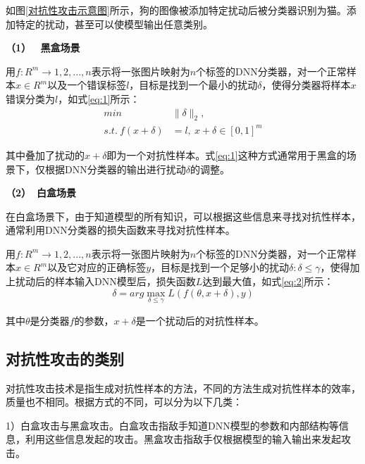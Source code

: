 如图\ref{对抗性攻击示意图}所示，狗的图像被添加特定扰动后被分类器识别为猫。添加特定的扰动，甚至可以使模型输出任意类别。

\noindent\textbf{（1） \  黑盒场景   }

用$f:R^m \rightarrow {1,2,...,n}$表示将一张图片映射为$n$个标签的DNN分类器，对一个正常样本$x \in R^m$以及一个错误标签$l$，目标是找到一个最小的扰动$\delta$，使得分类器将样本$x$错误分类为$l$，如式\ref{eq:1}所示：
\begin{equation}
	\label{eq:1}
	\begin{split}
	min&\parallel \delta \parallel_2, \\
	 s.t. \ f(x + \delta) &= l,\ x + \delta \in [0,1]^m
	\end{split}
\end{equation}

其中叠加了扰动的$x+\delta$即为一个对抗性样本。式\ref{eq:1}这种方式通常用于黑盒的场景下，仅根据DNN分类器的输出进行扰动$\delta$的调整。
 
\noindent\textbf{（2）\  白盒场景   }
 
 在白盒场景下，由于知道模型的所有知识，可以根据这些信息来寻找对抗性样本，通常利用DNN分类器的损失函数来寻找对抗性样本。
 
 用$f:R^m \rightarrow {1,2,...,n}$表示将一张图片映射为$n$个标签的DNN分类器，对一个正常样本$x \in R^m$以及它对应的正确标签$y$，目标是找到一个足够小的扰动$\delta:\delta \leq \gamma$，使得加上扰动后的样本输入DNN模型后，损失函数$L$达到最大值，如式\ref{eq:2}所示：
 \begin{equation}
 	\label{eq:2}
 		\delta = arg \mathop{max} \limits_{\delta \leq \gamma} L(f(\theta, x + \delta), y)
\end{equation}

其中$\theta$是分类器$f$的参数，$x + \delta$是一个扰动后的对抗性样本。
 
 \subsection{对抗性攻击的类别}

对抗性攻击技术是指生成对抗性样本的方法，不同的方法生成对抗性样本的效率，质量也不相同。根据方式的不同，可以分为以下几类：

1）白盒攻击与黑盒攻击。白盒攻击指敌手知道DNN模型的参数和内部结构等信息，利用这些信息发起的攻击。黑盒攻击指敌手仅根据模型的输入输出来发起攻击。

